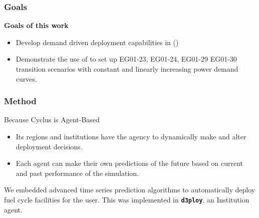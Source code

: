 \begin{frame}
\frametitle{Goals}
\textbf{Goals of this work} 
\begin{itemize}
	\item Develop demand driven deployment capabilities in \Cyclus (\deploy)
	\item Demonstrate the use of \deploy to set up EG01-23, EG01-24, EG01-29
	EG01-30 transition scenarios with constant and linearly increasing 
	power demand curves. 
\end{itemize}

\end{frame}

\begin{frame}
\frametitle{Method}
\begin{block}{Because Cyclus is Agent-Based}
	\begin{itemize}
		\item Its regions and institutions have the agency to dynamically make and alter deployment decisions.
		\item Each agent can make their own predictions of the future based on current and past performance of the simulation.
	\end{itemize}
	
	We embedded advanced time series prediction algorithms to automatically
	deploy fuel cycle facilities for the user. This was implemented
	in \textbf{\texttt{d3ploy}}, an Institution agent.
\end{block}
\end{frame}

%

